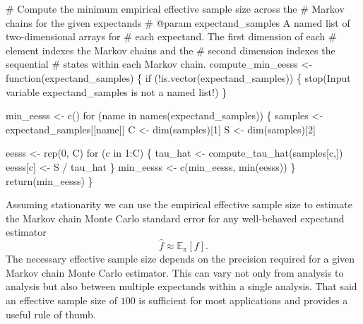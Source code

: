\documentclass[
  letterpaper,
  DIV=11,
  numbers=noendperiod]{scrartcl}
\newenvironment{Shaded}{\begin{snugshade}}{\end{snugshade}}
\newcommand{\BuiltInTok}[1]{\textcolor[rgb]{0.00,0.23,0.31}{#1}}
\newcommand{\CommentTok}[1]{\textcolor[rgb]{0.37,0.37,0.37}{#1}}
\newcommand{\ControlFlowTok}[1]{\textcolor[rgb]{0.00,0.23,0.31}{#1}}
\newcommand{\DecValTok}[1]{\textcolor[rgb]{0.68,0.00,0.00}{#1}}
\newcommand{\KeywordTok}[1]{\textcolor[rgb]{0.00,0.23,0.31}{#1}}
\newcommand{\NormalTok}[1]{\textcolor[rgb]{0.00,0.23,0.31}{#1}}
\newcommand{\OperatorTok}[1]{\textcolor[rgb]{0.37,0.37,0.37}{#1}}
\newcommand{\StringTok}[1]{\textcolor[rgb]{0.13,0.47,0.30}{#1}}
\begin{document}
\begin{Shaded}
\begin{Highlighting}[]
\CommentTok{\# Compute the minimum empirical effective sample size across the }
\CommentTok{\# Markov chains for the given expectands}
\CommentTok{\# @param expectand\_samples A named list of two{-}dimensional arrays for }
\CommentTok{\#                          each expectand.  The first dimension of each}
\CommentTok{\#                          element indexes the Markov chains and the }
\CommentTok{\#                          second dimension indexes the sequential }
\CommentTok{\#                          states within each Markov chain.}
\NormalTok{compute\_min\_eesss }\OperatorTok{\textless{}{-}}\NormalTok{ function(expectand\_samples) \{}
  \ControlFlowTok{if}\NormalTok{ (}\OperatorTok{!}\KeywordTok{is}\NormalTok{.vector(expectand\_samples)) \{}
\NormalTok{    stop(}\StringTok{\textquotesingle{}Input variable \textasciigrave{}expectand\_samples\textasciigrave{} is not a named list!\textquotesingle{}}\NormalTok{)}
\NormalTok{  \}}

\NormalTok{  min\_eesss }\OperatorTok{\textless{}{-}}\NormalTok{ c()}
  \ControlFlowTok{for}\NormalTok{ (name }\KeywordTok{in}\NormalTok{ names(expectand\_samples)) \{}
\NormalTok{    samples }\OperatorTok{\textless{}{-}}\NormalTok{ expectand\_samples[[name]]}
\NormalTok{    C }\OperatorTok{\textless{}{-}}\NormalTok{ dim(samples)[}\DecValTok{1}\NormalTok{]}
\NormalTok{    S }\OperatorTok{\textless{}{-}}\NormalTok{ dim(samples)[}\DecValTok{2}\NormalTok{]}
    
\NormalTok{    eesss }\OperatorTok{\textless{}{-}}\NormalTok{ rep(}\DecValTok{0}\NormalTok{, C)}
    \ControlFlowTok{for}\NormalTok{ (c }\KeywordTok{in} \DecValTok{1}\NormalTok{:C) \{}
\NormalTok{      tau\_hat }\OperatorTok{\textless{}{-}}\NormalTok{ compute\_tau\_hat(samples[c,])}
\NormalTok{      eesss[c] }\OperatorTok{\textless{}{-}}\NormalTok{ S }\OperatorTok{/}\NormalTok{ tau\_hat}
\NormalTok{    \}}
\NormalTok{    min\_eesss }\OperatorTok{\textless{}{-}}\NormalTok{ c(min\_eesss, }\BuiltInTok{min}\NormalTok{(eesss))}
\NormalTok{  \}}
  \ControlFlowTok{return}\NormalTok{(min\_eesss)}
\NormalTok{\}}
\end{Highlighting}
\end{Shaded}

Assuming stationarity we can use the empirical effective sample size to
estimate the Markov chain Monte Carlo standard error for any
well-behaved expectand estimator \[
\hat{f} \approx \mathbb{E}_{\pi}[f].
\] The necessary effective sample size depends on the precision required
for a given Markov chain Monte Carlo estimator. This can vary not only
from analysis to analysis but also between multiple expectands within a
single analysis. That said an effective sample size of \(100\) is
sufficient for most applications and provides a useful rule of thumb.
\end{document}
